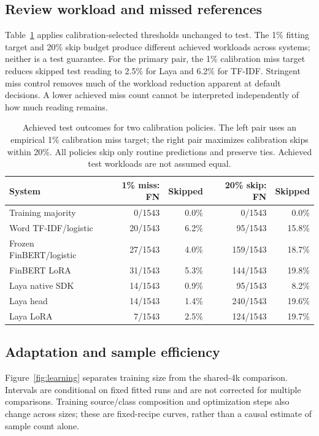 \subsection{Review workload and missed references}

Table~\ref{tab:policy} applies calibration-selected thresholds unchanged to test. The 1\% fitting target and 20\% skip budget produce different achieved workloads across systems; neither is a test guarantee. For the primary pair, the 1\% calibration miss target reduces skipped test reading to 2.5\% for Laya and 6.2\% for TF-IDF. Stringent miss control removes much of the workload reduction apparent at default decisions. A lower achieved miss count cannot be interpreted independently of how much reading remains.

\begin{table}[!htbp]
\centering
\caption{Achieved test outcomes for two calibration policies. The left pair uses an empirical 1\% calibration miss target; the right pair maximizes calibration skips within 20\%. All policies skip only routine predictions and preserve ties. Achieved test workloads are not assumed equal.}
\label{tab:policy}
\small
\setlength{\tabcolsep}{3.5pt}
\begin{tabularx}{\linewidth}{@{}Xrrrr@{}}
\toprule
System & 1\% miss: FN & Skipped & 20\% skip: FN & Skipped\\
\midrule
Training majority & 0/1543 & 0.0\% & 0/1543 & 0.0\%\\
Word TF-IDF/logistic & 20/1543 & 6.2\% & 95/1543 & 15.8\%\\
Frozen FinBERT/logistic & 27/1543 & 4.0\% & 159/1543 & 18.7\%\\
FinBERT LoRA & 31/1543 & 5.3\% & 144/1543 & 19.8\%\\
Laya native SDK & 14/1543 & 0.9\% & 95/1543 & 8.2\%\\
Laya head & 14/1543 & 1.4\% & 240/1543 & 19.6\%\\
Laya LoRA & 7/1543 & 2.5\% & 124/1543 & 19.7\%\\
\bottomrule
\end{tabularx}
\end{table}

\subsection{Adaptation and sample efficiency}

Figure~\ref{fig:learning} separates training size from the shared-4k comparison. Intervals are conditional on fixed fitted runs and are not corrected for multiple comparisons. Training source/class composition and optimization steps also change across sizes; these are fixed-recipe curves, rather than a causal estimate of sample count alone.

